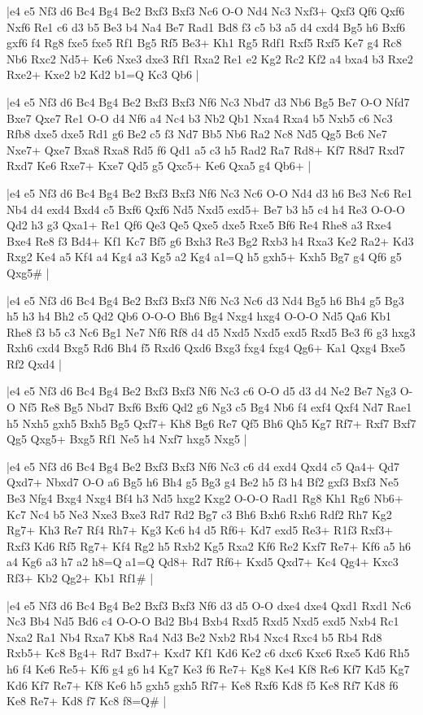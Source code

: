 \whitename{}
\blackname{}
\makegametitle
|e4 e5 Nf3 d6 Bc4 Bg4 Be2 Bxf3 Bxf3 Nc6 O-O Nd4 Nc3 Nxf3+ Qxf3 Qf6 Qxf6 Nxf6 Re1 c6 d3 b5 Be3 b4 Na4 Be7 Rad1 Bd8 f3 c5 b3 a5 d4 cxd4 Bg5 h6 Bxf6 gxf6 f4 Rg8 fxe5 fxe5 Rf1 Bg5 Rf5 Be3+ Kh1 Rg5 Rdf1 Rxf5 Rxf5 Ke7 g4 Rc8 Nb6 Rxc2 Nd5+ Ke6 Nxe3 dxe3 Rf1 Rxa2 Re1 e2 Kg2 Rc2 Kf2 a4 bxa4 b3 Rxe2 Rxe2+ Kxe2 b2 Kd2 b1=Q Kc3 Qb6  |

\whitename{}
\blackname{}
\makegametitle
|e4 e5 Nf3 d6 Bc4 Bg4 Be2 Bxf3 Bxf3 Nf6 Nc3 Nbd7 d3 Nb6 Bg5 Be7 O-O Nfd7 Bxe7 Qxe7 Re1 O-O d4 Nf6 a4 Nc4 b3 Nb2 Qb1 Nxa4 Rxa4 b5 Nxb5 c6 Nc3 Rfb8 dxe5 dxe5 Rd1 g6 Be2 c5 f3 Nd7 Bb5 Nb6 Ra2 Nc8 Nd5 Qg5 Bc6 Ne7 Nxe7+ Qxe7 Bxa8 Rxa8 Rd5 f6 Qd1 a5 c3 h5 Rad2 Ra7 Rd8+ Kf7 R8d7 Rxd7 Rxd7 Ke6 Rxe7+ Kxe7 Qd5 g5 Qxc5+ Ke6 Qxa5 g4 Qb6+  |

\whitename{}
\blackname{}
\makegametitle
|e4 e5 Nf3 d6 Bc4 Bg4 Be2 Bxf3 Bxf3 Nf6 Nc3 Nc6 O-O Nd4 d3 h6 Be3 Nc6 Re1 Nb4 d4 exd4 Bxd4 c5 Bxf6 Qxf6 Nd5 Nxd5 exd5+ Be7 b3 h5 c4 h4 Re3 O-O-O Qd2 h3 g3 Qxa1+ Re1 Qf6 Qe3 Qe5 Qxe5 dxe5 Rxe5 Bf6 Re4 Rhe8 a3 Rxe4 Bxe4 Re8 f3 Bd4+ Kf1 Kc7 Bf5 g6 Bxh3 Re3 Bg2 Rxb3 h4 Rxa3 Ke2 Ra2+ Kd3 Rxg2 Ke4 a5 Kf4 a4 Kg4 a3 Kg5 a2 Kg4 a1=Q h5 gxh5+ Kxh5 Bg7 g4 Qf6 g5 Qxg5\#  |

\whitename{}
\blackname{}
\makegametitle
|e4 e5 Nf3 d6 Bc4 Bg4 Be2 Bxf3 Bxf3 Nf6 Nc3 Nc6 d3 Nd4 Bg5 h6 Bh4 g5 Bg3 h5 h3 h4 Bh2 c5 Qd2 Qb6 O-O-O Bh6 Bg4 Nxg4 hxg4 O-O-O Nd5 Qa6 Kb1 Rhe8 f3 b5 c3 Nc6 Bg1 Ne7 Nf6 Rf8 d4 d5 Nxd5 Nxd5 exd5 Rxd5 Be3 f6 g3 hxg3 Rxh6 cxd4 Bxg5 Rd6 Bh4 f5 Rxd6 Qxd6 Bxg3 fxg4 fxg4 Qg6+ Ka1 Qxg4 Bxe5 Rf2 Qxd4  |

\whitename{}
\blackname{}
\makegametitle
|e4 e5 Nf3 d6 Bc4 Bg4 Be2 Bxf3 Bxf3 Nf6 Nc3 c6 O-O d5 d3 d4 Ne2 Be7 Ng3 O-O Nf5 Re8 Bg5 Nbd7 Bxf6 Bxf6 Qd2 g6 Ng3 c5 Bg4 Nb6 f4 exf4 Qxf4 Nd7 Rae1 h5 Nxh5 gxh5 Bxh5 Bg5 Qxf7+ Kh8 Bg6 Re7 Qf5 Bh6 Qh5 Kg7 Rf7+ Rxf7 Bxf7 Qg5 Qxg5+ Bxg5 Rf1 Ne5 h4 Nxf7 hxg5 Nxg5  |

\whitename{}
\blackname{}
\makegametitle
|e4 e5 Nf3 d6 Bc4 Bg4 Be2 Bxf3 Bxf3 Nf6 Nc3 c6 d4 exd4 Qxd4 c5 Qa4+ Qd7 Qxd7+ Nbxd7 O-O a6 Bg5 h6 Bh4 g5 Bg3 g4 Be2 h5 f3 h4 Bf2 gxf3 Bxf3 Ne5 Be3 Nfg4 Bxg4 Nxg4 Bf4 h3 Nd5 hxg2 Kxg2 O-O-O Rad1 Rg8 Kh1 Rg6 Nb6+ Kc7 Nc4 b5 Ne3 Nxe3 Bxe3 Rd7 Rd2 Bg7 c3 Bh6 Bxh6 Rxh6 Rdf2 Rh7 Kg2 Rg7+ Kh3 Re7 Rf4 Rh7+ Kg3 Kc6 h4 d5 Rf6+ Kd7 exd5 Re3+ R1f3 Rxf3+ Rxf3 Kd6 Rf5 Rg7+ Kf4 Rg2 h5 Rxb2 Kg5 Rxa2 Kf6 Re2 Kxf7 Re7+ Kf6 a5 h6 a4 Kg6 a3 h7 a2 h8=Q a1=Q Qd8+ Rd7 Rf6+ Kxd5 Qxd7+ Kc4 Qg4+ Kxc3 Rf3+ Kb2 Qg2+ Kb1 Rf1\#  |

\whitename{}
\blackname{}
\makegametitle
|e4 e5 Nf3 d6 Bc4 Bg4 Be2 Bxf3 Bxf3 Nf6 d3 d5 O-O dxe4 dxe4 Qxd1 Rxd1 Nc6 Nc3 Bb4 Nd5 Bd6 c4 O-O-O Bd2 Bb4 Bxb4 Rxd5 Rxd5 Nxd5 exd5 Nxb4 Rc1 Nxa2 Ra1 Nb4 Rxa7 Kb8 Ra4 Nd3 Be2 Nxb2 Rb4 Nxc4 Rxc4 b5 Rb4 Rd8 Rxb5+ Kc8 Bg4+ Rd7 Bxd7+ Kxd7 Kf1 Kd6 Ke2 c6 dxc6 Kxc6 Rxe5 Kd6 Rh5 h6 f4 Ke6 Re5+ Kf6 g4 g6 h4 Kg7 Ke3 f6 Re7+ Kg8 Ke4 Kf8 Re6 Kf7 Kd5 Kg7 Kd6 Kf7 Re7+ Kf8 Ke6 h5 gxh5 gxh5 Rf7+ Ke8 Rxf6 Kd8 f5 Ke8 Rf7 Kd8 f6 Ke8 Re7+ Kd8 f7 Kc8 f8=Q\#  |

